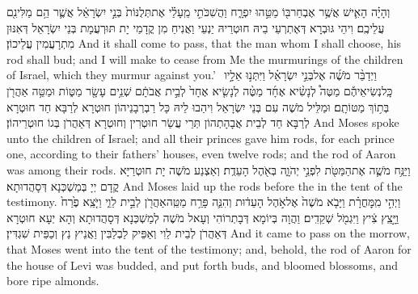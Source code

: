 {וְהָיָ֗ה הָאִ֛ישׁ אֲשֶׁ֥ר אֶבְחַר\maqqaf בּ֖וֹ מַטֵּ֣הוּ יִפְרָ֑ח וַהֲשִׁכֹּתִ֣י מֵֽעָלַ֗י אֶת\maqqaf תְּלֻנּוֹת֙ בְּנֵ֣י יִשְׂרָאֵ֔ל אֲשֶׁ֛ר הֵ֥ם מַלִּינִ֖ם עֲלֵיכֶֽם׃}
{וִיהֵי גּוּבְרָא דְּאֶתְרְעֵי בֵיהּ חוּטְרֵיהּ יַנְעֵי וַאֲנִיחַ מִן קֳדָמַי יָת תּוּרְעֲמָת בְּנֵי יִשְׂרָאֵל דְּאִנּוּן מִתְרָעֲמִין עֲלֵיכוֹן׃}
{And it shall come to pass, that the man whom I shall choose, his rod shall bud; and I will make to cease from Me the murmurings of the children of Israel, which they murmur against you.’}{}
{וַיְדַבֵּ֨ר מֹשֶׁ֜ה אֶל\maqqaf בְּנֵ֣י יִשְׂרָאֵ֗ל וַיִּתְּנ֣וּ אֵלָ֣יו \pasek  כָּֽל\maqqaf נְשִׂיאֵיהֶ֡ם מַטֶּה֩ לְנָשִׂ֨יא אֶחָ֜ד מַטֶּ֨ה לְנָשִׂ֤יא אֶחָד֙ לְבֵ֣ית אֲבֹתָ֔ם שְׁנֵ֥ים עָשָׂ֖ר מַטּ֑וֹת וּמַטֵּ֥ה אַהֲרֹ֖ן בְּת֥וֹךְ מַטּוֹתָֽם׃}
{וּמַלֵּיל מֹשֶׁה עִם בְּנֵי יִשְׂרָאֵל וִיהַבוּ לֵיהּ כָּל רַבְרְבָנֵיהוֹן חוּטְרָא לְרַבָּא חַד חוּטְרָא לְרַבָּא חַד לְבֵית אֲבָהָתְהוֹן תְּרֵי עֲשַׂר חוּטְרִין וְחוּטְרָא דְּאַהֲרֹן בְּגוֹ חוּטְרֵיהוֹן׃}
{And Moses spoke unto the children of Israel; and all their princes gave him rods, for each prince one, according to their fathers’ houses, even twelve rods; and the rod of Aaron was among their rods.}{}
{וַיַּנַּ֥ח מֹשֶׁ֛ה אֶת\maqqaf הַמַּטֹּ֖ת לִפְנֵ֣י יְהֹוָ֑ה בְּאֹ֖הֶל הָעֵדֻֽת׃}
{וְאַצְנַע מֹשֶׁה יָת חוּטְרַיָּא קֳדָם יְיָ בְּמַשְׁכְּנָא דְּסָהֲדוּתָא׃}
{And Moses laid up the rods before the \lord\space in the tent of the testimony.}{}
{וַיְהִ֣י מִֽמׇּחֳרָ֗ת וַיָּבֹ֤א מֹשֶׁה֙ אֶל\maqqaf אֹ֣הֶל הָעֵד֔וּת וְהִנֵּ֛ה פָּרַ֥ח מַטֵּֽה\maqqaf אַהֲרֹ֖ן לְבֵ֣ית לֵוִ֑י וַיֹּ֤צֵֽא פֶ֙רַח֙ וַיָּ֣צֵֽץ צִ֔יץ וַיִּגְמֹ֖ל שְׁקֵדִֽים׃}
{וַהֲוָה בְּיוֹמָא דְּבָתְרוֹהִי וְעָאל מֹשֶׁה לְמַשְׁכְּנָא דְּסָהֲדוּתָא וְהָא יְעָא חוּטְרָא דְּאַהֲרֹן לְבֵית לֵוִי וְאַפֵּיק לַבְלַבִּין וַאֲנֵיץ נַץ וְכַפֵּית שִׁגְדִּין׃}
{And it came to pass on the morrow, that Moses went into the tent of the testimony; and, behold, the rod of Aaron for the house of Levi was budded, and put forth buds, and bloomed blossoms, and bore ripe almonds.}{}
